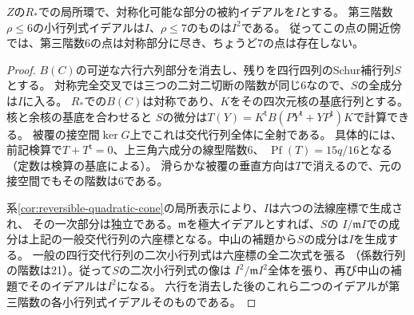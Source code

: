 \begin{proposition}\label{prop:reversible-low-opposite-ideals}
$Z$の$R_*$での局所環で、対称化可能な部分の被約イデアルを$I$とする。
第三階数$\rho\le6$の小行列式イデアルは$I$、$\rho\le7$のものは$I^2$である。
従ってこの点の開近傍では、第三階数6の点は対称部分に尽き、ちょうど7の点は存在しない。
\end{proposition}
\begin{proof}
$B(C)$の可逆な六行六列部分を消去し、残りを四行四列のSchur補行列$S$とする。
対称完全交叉では三つの二対二切断の階数が同じ6なので、$S$の全成分は$I$に入る。
$R_*$での$B(C)$は対称であり、$K$をその四次元核の基底行列とする。核と余核の基底を合わせると
$S$の微分は$T(Y)=K^{\mathsf t}B(PY^{\mathsf t}+YP^{\mathsf t})K$で計算できる。
被覆の接空間$\ker G$上でこれは交代行列全体に全射である。
具体的には、前記検算で$T+T^{\mathsf t}=0$、上三角六成分の線型階数6、
$\operatorname{Pf}(T)=15q/16$となる（定数は検算の基底による）。
滑らかな被覆の垂直方向は$T$で消えるので、元の接空間でもその階数は6である。

系\ref{cor:reversible-quadratic-cone}の局所表示により、$I$は六つの法線座標で生成され、
その一次部分は独立である。$\mathfrak m$を極大イデアルとすれば、$S$の
$I/\mathfrak m I$での成分は上記の一般交代行列の六座標となる。中山の補題から$S$の成分は$I$を生成する。
一般の四行交代行列の二次小行列式は六座標の全二次式を張る
（係数行列の階数は21）。従って$S$の二次小行列式の像は
$I^2/\mathfrak m I^2$全体を張り、再び中山の補題でそのイデアルは$I^2$になる。
六行を消去した後のこれら二つのイデアルが第三階数の各小行列式イデアルそのものである。
\end{proof}
